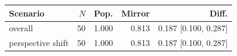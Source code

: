 \begin{tabular}{lrrrr}
\toprule
Scenario & $N$ & Pop. & Mirror & Diff. \\
\midrule
overall & 50 & 1.000 & 0.813 & 0.187 [0.100, 0.287] \\
perspective shift & 50 & 1.000 & 0.813 & 0.187 [0.100, 0.287] \\
\bottomrule
\end{tabular}

